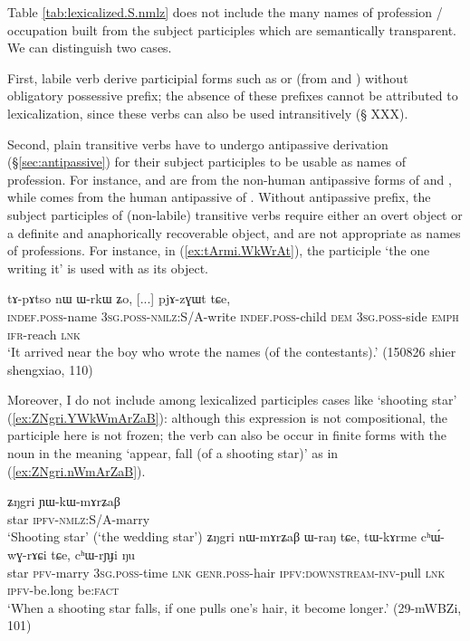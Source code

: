 Table \ref{tab:lexicalized.S.nmlz} does not include the many names of profession / occupation built from the subject participles which are semantically transparent. We can distinguish two cases. 

First, labile verb derive participial forms such as  or  (from  and ) without obligatory possessive prefix; the absence of these prefixes cannot be attributed to lexicalization, since these verbs can also be used intransitively (§ XXX). 

Second, plain transitive verbs have to undergo antipassive derivation (§\ref{sec:antipassive}) for their subject participles to be usable as names of profession. For instance,  and  are from the  non-human antipassive forms of  and , while   comes from the  human antipassive of . Without antipassive prefix, the subject participles of (non-labile) transitive verbs require either an overt object or a definite and anaphorically recoverable object, and are not appropriate as names of professions. For instance, in (\ref{ex:tArmi.WkWrAt}), the participle  `the one writing it' is used with  as its object.

\begin{exe}
\ex \label{ex:tArmi.WkWrAt}
  tɤ-pɤtso nɯ ɯ-rkɯ ʑo, [...] pjɤ-zɣɯt tɕe, \\
 \textsc{indef}.\textsc{poss}-name \textsc{3sg}.\textsc{poss}-\textsc{nmlz}:S/A-write  \textsc{indef}.\textsc{poss}-child \textsc{dem} \textsc{3sg}.\textsc{poss}-side \textsc{emph} { } \textsc{ifr}-reach \textsc{lnk} \\
\glt `It arrived near the boy who wrote the names (of the contestants).' (150826 shier shengxiao, 110)
\end{exe}

Moreover, I do not include among lexicalized participles cases like `shooting star' (\ref{ex:ZNgri.YWkWmArZaB}): although this expression is not compositional, the participle here is not frozen; the verb  can also be occur in finite forms with the noun  in the meaning `appear, fall (of a shooting star)' as in (\ref{ex:ZNgri.nWmArZaB}).

\begin{exe}
\ex \label{ex:ZNgri.YWkWmArZaB}
 \gll ʑŋgri ɲɯ-kɯ-mɤrʑaβ \\
 star \textsc{ipfv}-\textsc{nmlz}:S/A-marry \\
 \glt `Shooting star' (`the wedding star')
 \ex \label{ex:ZNgri.nWmArZaB}
 \gll ʑŋgri nɯ-mɤrʑaβ ɯ-raŋ tɕe, tɯ-kɤrme cʰɯ́-wɣ-rɤɕi tɕe, cʰɯ-rɲɟi ŋu\\
 star \textsc{pfv}-marry \textsc{3sg}.\textsc{poss}-time \textsc{lnk} \textsc{genr}.\textsc{poss}-hair \textsc{ipfv}:\textsc{downstream}-\textsc{inv}-pull \textsc{lnk} \textsc{ipfv}-be.long be:\textsc{fact} \\
 \glt `When a shooting star falls,  if one pulls one's hair, it become longer.' (29-mWBZi, 101)
\end{exe}

